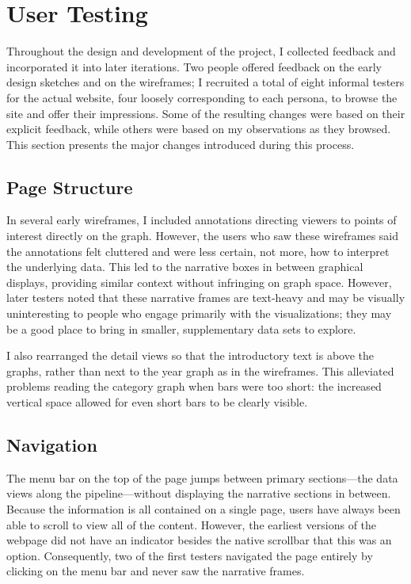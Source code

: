 \section{User Testing}\label{sec:testing}
Throughout the design and development of the project, I collected feedback and incorporated it into later iterations. Two people offered feedback on the early design sketches and on the wireframes; I recruited a total of eight informal testers for the actual website, four loosely corresponding to each persona, to browse the site and offer their impressions. Some of the resulting changes were based on their explicit feedback, while others were based on my observations as they browsed. This section presents the major changes introduced during this process.

\subsection{Page Structure}
In several early wireframes, I included annotations directing viewers to points of interest directly on the graph. However, the users who saw these wireframes said the annotations felt cluttered and were less certain, not more, how to interpret the underlying data. This led to the narrative boxes in between graphical displays, providing similar context without infringing on graph space. However, later testers noted that these narrative frames are text-heavy and may be visually uninteresting to people who engage primarily with the visualizations; they may be a good place to bring in smaller, supplementary data sets to explore.

I also rearranged the detail views so that the introductory text is above the graphs, rather than next to the year graph as in the wireframes. This alleviated problems reading the category graph when bars were too short: the increased vertical space allowed for even short bars to be clearly visible.

\subsection{Navigation}
The menu bar on the top of the page jumps between primary sections---the data views along the pipeline---without displaying the narrative sections in between. Because the information is all contained on a single page, users have always been able to scroll to view all of the content. However, the earliest versions of the webpage did not have an indicator besides the native scrollbar that this was an option. Consequently, two of the first testers navigated the page entirely by clicking on the menu bar and never saw the narrative frames.


